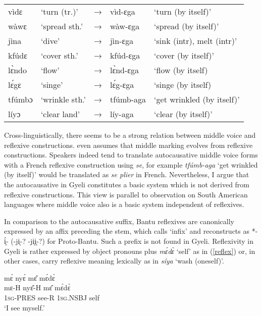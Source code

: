 \begin{exe} \ex \label{Autocaus}
\begin{tabular}{lllll}
vìdɛ & `turn (tr.)' & → & vìd-ɛga & `turn (by itself)' \\
wàwɛ & `spread sth.' & → & wàw-ɛga & `spread (by itself)' \\
jìna & `dive' & → & jìn-ɛga & `sink (intr), melt (intr)' \\
kfúdɛ & `cover sth.' & → & kfúd-ɛga & `cover (by itself)' \\
lɛ̀ndo & `flow' & → & lɛ̀nd-ɛga & `flow (by itself) \\
lɛ́gɛ & `singe' & → & lɛ́g-ɛga & `singe (by itself) \\
tfúmbɔ & `wrinkle sth.' & → & tfúmb-aga & `get wrinkled (by itself)' \\
líyɔ & `clear land' & → & líy-aga & `clear (by itself)' \\
\end{tabular}
\end{exe} 

Cross-linguistically, there seems to be a strong relation between middle voice and reflexive constructions. \citet{
kemmer93} even assumes  that middle marking evolves from reflexive constructions. Speakers indeed tend to translate autocausative middle voice forms with a French reflexive construction using {\itshape se}, for example {\itshape tfúmb-aga} `get wrinkled (by itself)' would be translated as {\itshape se plier} in French. Nevertheless, I argue that the autocausative in Gyeli constitutes a basic system which is not derived from reflexive constructions. This view is parallel to  observation on South American languages where middle voice also is a basic system independent of reflexives. 

In comparison to the autocausative suffix, Bantu reflexives are canonically expressed by an affix preceding the stem, which \citet[109]{meeussen67} calls `infix' and  reconstructs as *-ᶖ́-  (-jᶖ-? -jᶖᶖ-?)  for Proto-Bantu. Such a prefix is not found in Gyeli. Reflexivity in Gyeli is rather expressed by object pronouns plus {\itshape mɛ́dɛ̀} `self' as in (\ref{reflex}) or, in other cases, carry reflexive meaning lexically as in {\itshape síya} `wash (oneself)'.


\begin{exe} 
\ex\label{reflex}
  \glll     mɛ́ nyɛ́ mɛ̂ mɛ́dɛ̀ \\
	mɛ-H nyɛ̂-H mɛ̂ mɛ́dɛ̀ \\
              1\textsc{sg}-PRES see-R 1\textsc{sg}.NSBJ self   \\
    \trans `I see myself.'
\end{exe}

